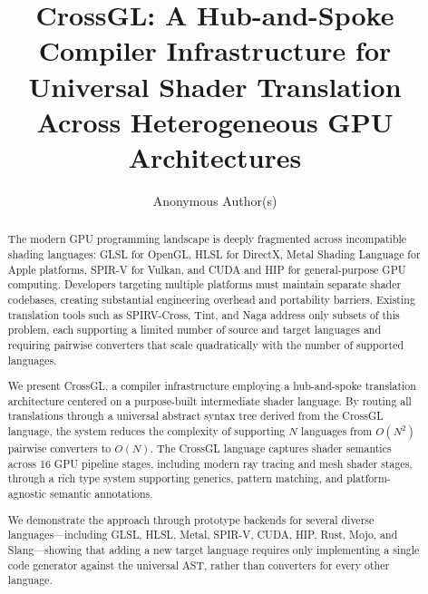 \documentclass{svproc}
\begin{document}
\mainmatter

\title{CrossGL: A Hub-and-Spoke Compiler Infrastructure for Universal Shader Translation Across Heterogeneous GPU Architectures}


\author{Anonymous Author(s)}

\maketitle

\begin{abstract}
The modern GPU programming landscape is deeply fragmented across incompatible shading languages: GLSL for OpenGL, HLSL for DirectX, Metal Shading Language for Apple platforms, SPIR-V for Vulkan, and CUDA and HIP for general-purpose GPU computing. Developers targeting multiple platforms must maintain separate shader codebases, creating substantial engineering overhead and portability barriers. Existing translation tools such as SPIRV-Cross, Tint, and Naga address only subsets of this problem, each supporting a limited number of source and target languages and requiring pairwise converters that scale quadratically with the number of supported languages.

We present CrossGL, a compiler infrastructure employing a hub-and-spoke translation architecture centered on a purpose-built intermediate shader language. By routing all translations through a universal abstract syntax tree derived from the CrossGL language, the system reduces the complexity of supporting $N$ languages from $O(N^2)$ pairwise converters to $O(N)$. The CrossGL language captures shader semantics across 16 GPU pipeline stages, including modern ray tracing and mesh shader stages, through a rich type system supporting generics, pattern matching, and platform-agnostic semantic annotations.

We demonstrate the approach through prototype backends for several diverse languages---including GLSL, HLSL, Metal, SPIR-V, CUDA, HIP, Rust, Mojo, and Slang---showing that adding a new target language requires only implementing a single code generator against the universal AST, rather than converters for every other language.

\end{abstract}
\end{document}

